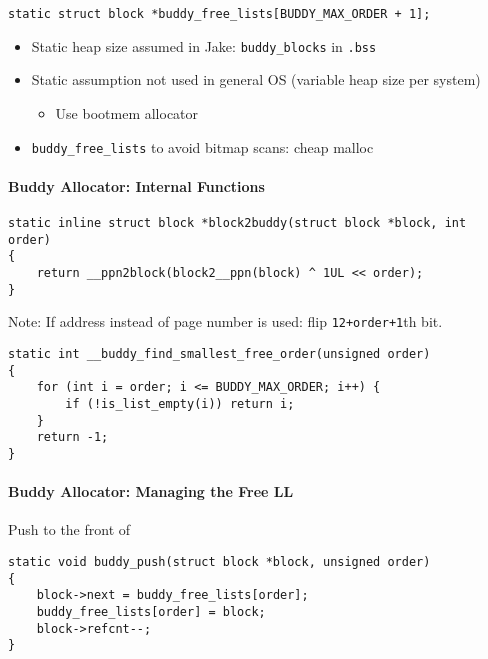 \begin{lstlisting}[style=bright_C++]
static struct block *buddy_free_lists[BUDDY_MAX_ORDER + 1];
\end{lstlisting}

\newpar{}
\begin{itemize}
    \item Static heap size assumed in Jake: \texttt{buddy\_blocks} in \texttt{.bss}
    \item Static assumption not used in general OS (variable heap size per system)
          \begin{itemize}
              \item Use bootmem allocator
          \end{itemize}
    \item \texttt{buddy\_free\_lists} to avoid bitmap scans: cheap malloc
\end{itemize}

\paragraph{Buddy Allocator: Internal Functions}
\begin{lstlisting}[style=bright_C++]
static inline struct block *block2buddy(struct block *block, int order)
{
    return __ppn2block(block2__ppn(block) ^ 1UL << order);
}
\end{lstlisting}
Note: If address instead of page number is used: flip \texttt{12+order+1}th bit.

\newpar{}
\begin{lstlisting}[style=bright_C++]
static int __buddy_find_smallest_free_order(unsigned order)
{
    for (int i = order; i <= BUDDY_MAX_ORDER; i++) {
        if (!is_list_empty(i)) return i;
    }
    return -1;
}
\end{lstlisting}

\paragraph{Buddy Allocator: Managing the Free LL}

Push to the front of 
\begin{lstlisting}[style=bright_C++]
static void buddy_push(struct block *block, unsigned order)
{
	block->next = buddy_free_lists[order];
	buddy_free_lists[order] = block;
	block->refcnt--;
}
\end{lstlisting}

